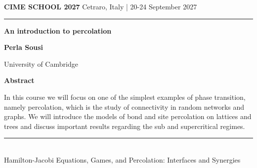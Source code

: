 \documentclass[11pt,a4paper]{article}
\begin{document}
{\small\bfseries\color{cimegold} CIME SCHOOL 2027}\hfill
{\small\color{cimeblue} Cetraro, Italy | 20-24 September 2027}

\vspace{5mm}
{\color{cimenavy}\rule{\textwidth}{1.2pt}}
\vspace{8mm}

{\fontsize{22}{27}\selectfont\bfseries\color{cimenavy}
An introduction to percolation\par}

\vspace{7mm}
{\large\bfseries Perla Sousi}\par
{\color{cimeblue} University of Cambridge}

\vspace{10mm}
{\large\bfseries\color{cimegold} Abstract}

In this course we will focus on one of the simplest examples of phase transition, namely percolation, which is the study of connectivity in random networks and graphs. We will introduce the models of bond and site percolation on lattices and trees and discuss important results regarding the sub and supercritical regimes.

\vfill
{\color{cimenavy}\rule{\textwidth}{0.5pt}}\\[-1mm]
{\footnotesize\color{cimeblue} Hamilton-Jacobi Equations, Games, and Percolation: Interfaces and Synergies}
\end{document}
